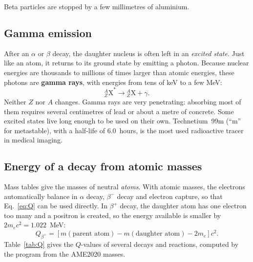 \documentclass[11pt,a4paper]{article}
\newcommand{\nuc}[3]{\ensuremath{{}^{#1}_{#2}\mathrm{#3}}}   %
\begin{document}
Beta particles are stopped by a few millimetres of aluminium.

\subsection{Gamma emission}

After an $\alpha$ or $\beta$ decay, the daughter nucleus is often left in an \emph{excited state}. Just like an atom, it returns to its ground state by emitting a photon. Because nuclear energies are thousands to millions of times larger than atomic energies, these photons are \textbf{gamma rays}, with energies from tens of keV to a few MeV:
\[
\nuc{A}{Z}{X}^* \longrightarrow \nuc{A}{Z}{X} + \gamma .
\]
Neither $Z$ nor $A$ changes. Gamma rays are very penetrating: absorbing most of them requires several centimetres of lead or about a metre of concrete. Some excited states live long enough to be used on their own. Technetium~99m (``m'' for metastable), with a half-life of 6.0~hours, is the most used radioactive tracer in medical imaging.

\subsection{Energy of a decay from atomic masses}

Mass tables give the masses of neutral \emph{atoms}. With atomic masses, the electrons automatically balance in $\alpha$ decay, $\beta^-$ decay and electron capture, so that Eq.~\eqref{eq:Q} can be used directly. In $\beta^+$ decay, the daughter atom has one electron too many and a positron is created, so the energy available is smaller by $2 m_e c^2 = 1.022$~MeV:
\[
Q_{\beta^+} = \left[ m(\text{parent atom}) - m(\text{daughter atom}) - 2 m_e \right] c^2 .
\]
Table~\ref{tab:Q} gives the $Q$-values of several decays and reactions, computed by the program from the AME2020 masses.
\end{document}

